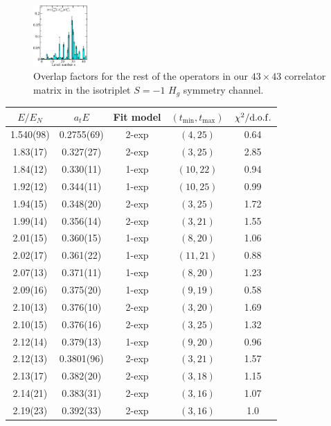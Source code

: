 \begin{figure}[H]
    \includegraphics[width=0.185\textwidth]{figures/sigmas/hg/zfactors/zfactor_isotriplet_pion_sigma-Hg_1-P111-A2m-SS_0-P-1-1-1-G-SS_4.pdf}
    \caption{Overlap factors for the rest of the operators in our $43\times 43$ correlator matrix in the isotriplet $S=-1$ $H_g$ symmetry channel.}\label{fig:hg_zfactors2}
\end{figure}

\newpage
\renewcommand{\arraystretch}{1.2}
\begin{longtabu}{c|c|c|c|c}
        $E / E_N$ & $a_t E$ & Fit model & $(t_{\mathrm{min}}, {t_\mathrm{max}})$ & $\chi^2 / \rm{d.o.f.}$\\
        \hline
        \rowfont{\color{red}}
        1.540(98)&0.2755(69)&2{-}exp&$(4, 25)$&0.64 \\
        1.83(17)&0.327(27)&2{-}exp&$(3, 25)$&2.85 \\
        1.84(12)&0.330(11)&1{-}exp&$(10, 22)$&0.94 \\
        1.92(12)&0.344(11)&1{-}exp&$(10, 25)$&0.99 \\
        1.94(15)&0.348(20)&2{-}exp&$(3, 25)$&1.72 \\
        1.99(14)&0.356(14)&2{-}exp&$(3, 21)$&1.55 \\
        2.01(15)&0.360(15)&1{-}exp&$(8, 20)$&1.06 \\
        2.02(17)&0.361(22)&1{-}exp&$(11, 21)$&0.88 \\
        2.07(13)&0.371(11)&1{-}exp&$(8, 20)$&1.23 \\
        2.09(16)&0.375(20)&1{-}exp&$(9, 19)$&0.58 \\
        2.10(13)&0.376(10)&2{-}exp&$(3, 20)$&1.69 \\
        2.10(15)&0.376(16)&2{-}exp&$(3, 25)$&1.32 \\
        2.12(14)&0.379(13)&1{-}exp&$(9, 20)$&0.96 \\
        \rowfont{\color{red}}
        2.12(13)&0.3801(96)&2{-}exp&$(3, 21)$&1.57 \\
        2.13(17)&0.382(20)&2{-}exp&$(3, 18)$&1.15 \\
        2.14(21)&0.383(31)&2{-}exp&$(3, 16)$&1.07 \\
        2.19(23)&0.392(33)&2{-}exp&$(3, 16)$&1.0 \\

\end{longtabu}
